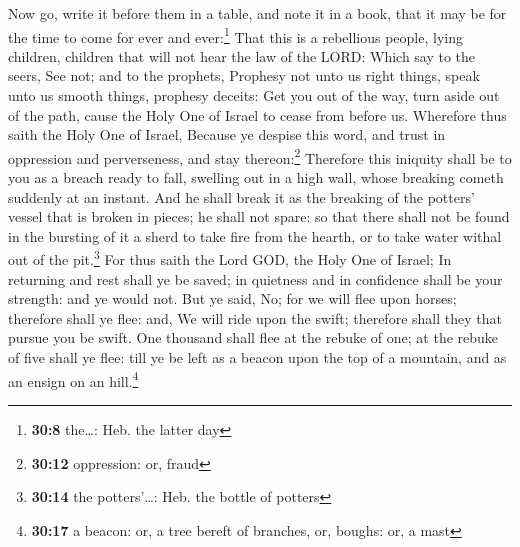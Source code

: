  Now go, write it before them in a table, and note it in a
book, that it may be for the time to come for ever and ever:\footnote{\textbf{30:8}
  the\ldots: Heb. the latter day}  That this is a
rebellious people, lying children, children that will not hear the law
of the LORD:  Which say to the seers, See not; and to the
prophets, Prophesy not unto us right things, speak unto us smooth
things, prophesy deceits:  Get you out of the way, turn
aside out of the path, cause the Holy One of Israel to cease from before
us.  Wherefore thus saith the Holy One of Israel, Because
ye despise this word, and trust in oppression and perverseness, and stay
thereon:\footnote{\textbf{30:12} oppression: or, fraud} 
Therefore this iniquity shall be to you as a breach ready to fall,
swelling out in a high wall, whose breaking cometh suddenly at an
instant.  And he shall break it as the breaking of the
potters' vessel that is broken in pieces; he shall not spare: so that
there shall not be found in the bursting of it a sherd to take fire from
the hearth, or to take water withal out of the pit.\footnote{\textbf{30:14}
  the potters'\ldots: Heb. the bottle of potters}  For
thus saith the Lord GOD, the Holy One of Israel; In returning and rest
shall ye be saved; in quietness and in confidence shall be your
strength: and ye would not.  But ye said, No; for we will
flee upon horses; therefore shall ye flee: and, We will ride upon the
swift; therefore shall they that pursue you be swift. 
One thousand shall flee at the rebuke of one; at the rebuke of five
shall ye flee: till ye be left as a beacon upon the top of a mountain,
and as an ensign on an hill.\footnote{\textbf{30:17} a beacon: or, a
  tree bereft of branches, or, boughs: or, a mast}

